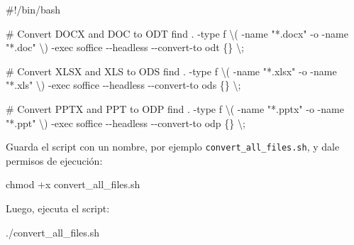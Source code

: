 \documentclass[
  jou,
  floatsintext,
  longtable,
  a4paper,
  nolmodern,
  notxfonts,
  notimes,
  colorlinks=true,linkcolor=blue,citecolor=blue,urlcolor=blue]{apa7}
\newenvironment{Shaded}{\begin{snugshade}}{\end{snugshade}}
\newcommand{\AttributeTok}[1]{\textcolor[rgb]{0.40,0.45,0.13}{#1}}
\newcommand{\CommentTok}[1]{\textcolor[rgb]{0.37,0.37,0.37}{#1}}
\newcommand{\DataTypeTok}[1]{\textcolor[rgb]{0.68,0.00,0.00}{#1}}
\newcommand{\ExtensionTok}[1]{\textcolor[rgb]{0.00,0.23,0.31}{#1}}
\newcommand{\FunctionTok}[1]{\textcolor[rgb]{0.28,0.35,0.67}{#1}}
\newcommand{\NormalTok}[1]{\textcolor[rgb]{0.00,0.23,0.31}{#1}}
\newcommand{\StringTok}[1]{\textcolor[rgb]{0.13,0.47,0.30}{#1}}
\begin{document}
\begin{Shaded}
\begin{Highlighting}[]
\CommentTok{\#!/bin/bash}

\CommentTok{\# Convert DOCX and DOC to ODT}
\FunctionTok{find}\NormalTok{ . }\AttributeTok{{-}type}\NormalTok{ f }\DataTypeTok{\textbackslash{}(} \AttributeTok{{-}name} \StringTok{"*.docx"} \AttributeTok{{-}o} \AttributeTok{{-}name} \StringTok{"*.doc"} \DataTypeTok{\textbackslash{})} \AttributeTok{{-}exec}\NormalTok{ soffice }\AttributeTok{{-}{-}headless} \AttributeTok{{-}{-}convert{-}to}\NormalTok{ odt \{\} }\DataTypeTok{\textbackslash{};}

\CommentTok{\# Convert XLSX and XLS to ODS}
\FunctionTok{find}\NormalTok{ . }\AttributeTok{{-}type}\NormalTok{ f }\DataTypeTok{\textbackslash{}(} \AttributeTok{{-}name} \StringTok{"*.xlsx"} \AttributeTok{{-}o} \AttributeTok{{-}name} \StringTok{"*.xls"} \DataTypeTok{\textbackslash{})} \AttributeTok{{-}exec}\NormalTok{ soffice }\AttributeTok{{-}{-}headless} \AttributeTok{{-}{-}convert{-}to}\NormalTok{ ods \{\} }\DataTypeTok{\textbackslash{};}

\CommentTok{\# Convert PPTX and PPT to ODP}
\FunctionTok{find}\NormalTok{ . }\AttributeTok{{-}type}\NormalTok{ f }\DataTypeTok{\textbackslash{}(} \AttributeTok{{-}name} \StringTok{"*.pptx"} \AttributeTok{{-}o} \AttributeTok{{-}name} \StringTok{"*.ppt"} \DataTypeTok{\textbackslash{})} \AttributeTok{{-}exec}\NormalTok{ soffice }\AttributeTok{{-}{-}headless} \AttributeTok{{-}{-}convert{-}to}\NormalTok{ odp \{\} }\DataTypeTok{\textbackslash{};}
\end{Highlighting}
\end{Shaded}

Guarda el script con un nombre, por ejemplo
\texttt{convert\_all\_files.sh}, y dale permisos de ejecución:

\begin{Shaded}
\begin{Highlighting}[]
\FunctionTok{chmod}\NormalTok{ +x convert\_all\_files.sh}
\end{Highlighting}
\end{Shaded}

Luego, ejecuta el script:

\begin{Shaded}
\begin{Highlighting}[]
\ExtensionTok{./convert\_all\_files.sh}
\end{Highlighting}
\end{Shaded}
\end{document}
